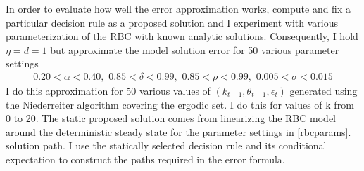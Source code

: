 \documentclass[12pt]{article}
\begin{document}














In order to evaluate how well the error approximation works, compute and
fix a particular decision rule as a proposed solution and I 
experiment with various parameterization of the 
RBC with known analytic solutions.
Consequently, I hold $\eta=d=1$ but approximate the model solution error 
for 50 various  parameter settings
\begin{gather*}
 0.20 <\alpha<0.40,\,\,0.85<\delta<0.99,\,\,0.85<\rho<0.99,\,\,0.005<\sigma<0.015
\end{gather*}
I do this approximation for 50 various values of 
$(k_{t-1},\theta_{t-1},\epsilon_t)$ generated using the Niederreiter algorithm
 covering the ergodic set.  I do this for values of k from 0 to 20.  The static proposed solution comes from linearizing
the RBC model around the deterministic steady state for
 the parameter settings in \ref{rbcparams}.  
solution path.  I use the statically selected decision rule and its conditional
expectation to construct the paths required in the error formula. 
\end{document}
